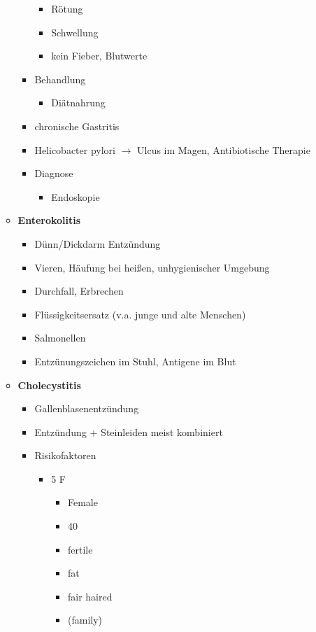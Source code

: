 \begin{itemize}
\begin{itemize}
\begin{itemize}
\begin{itemize}
							\item Rötung
							\item Schwellung
							\item kein Fieber, Blutwerte
						\end{itemize}
					\item Behandlung
						\begin{itemize}
							\item Diätnahrung
						\end{itemize}
					\item chronische Gastritis
					\item Helicobacter pylori $\rightarrow$ Ulcus im Magen, Antibiotische Therapie
					\item Diagnose
						\begin{itemize}
							\item Endoskopie
						\end{itemize}
				\end{itemize}
			\item \textbf{Enterokolitis}
				\begin{itemize}
					\item Dünn/Dickdarm Entzündung
					\item Vieren, Häufung bei heißen, unhygienischer Umgebung
					\item Durchfall, Erbrechen
					\item Flüssigkeitsersatz (v.a. junge und alte Menschen)
					\item Salmonellen
					\item Entzünungszeichen im Stuhl, Antigene im Blut
				\end{itemize}
			\item \textbf{Cholecystitis}
				\begin{itemize}
					\item Gallenblasenentzündung
					\item Entzündung + Steinleiden meist kombiniert
					\item Risikofaktoren
						\begin{itemize}
							\item 5 F
								\begin{itemize}
									\item Female
									\item 40
									\item fertile
									\item fat
									\item fair haired
									\item (family)

\end{itemize}
\end{itemize}
\end{itemize}
\end{itemize}
\end{itemize}
